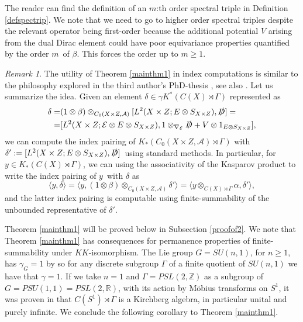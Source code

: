 \documentclass[a4paper,reqno]{amsart}
\numberwithin{equation}{section}
\def\R{\mathbb{R}}
\def\Z{\mathbb{Z}}
\theoremstyle{definition}
\theoremstyle{remark}
\newtheorem{remark*}[thm*]{Remark}
\begin{document}
The reader can find the definition of an $m$:th order spectral triple in Definition \ref{defspectrip}. We note that we need to go to higher order spectral triples despite the relevant operator being first-order because the additional potential $V$ arising from the dual Dirac element could have poor equivariance properties quantified by the order $m$ of $\beta$. This forces the order up to $m\geq 1$. 


\begin{remark*}
The utility of Theorem \ref{mainthm1} in index computations is similar to the philosophy explored in the third author's PhD-thesis \cite{levithesis}, see also \cite{levipaper}. Let us summarize the idea. Given an element $\delta\in \gamma K^*(C(X)\rtimes \Gamma)$ represented as 
\begin{align}
\label{kasprodforsda}
\delta=&(1\otimes \beta)\otimes_{C_0(X\times Z,\mathcal{A})} [L^2(X\times Z;E\otimes S_{X\times Z}),\slashed{D}]=\\
\nonumber
=&[L^2(X\times Z;\mathcal{E}\otimes E\otimes S_{X\times Z} ),1\otimes_{\nabla_\mathcal{E}}\slashed{D}+V\otimes 1_{E\otimes S_{X\times Z}}],
\end{align}
we can compute the index pairing of $K_*(C_0(X\times Z,\mathcal{A})\rtimes \Gamma)$ with $\delta':=[L^2(X\times Z;E\otimes S_{X\times Z}),\slashed{D}]$ using standard methods. In particular, for $y\in K_*(C(X)\rtimes \Gamma)$, we can using the associativity of the Kasparov product to write the index pairing of $y$ with $\delta$ as 
$$\langle y,\delta\rangle=\langle y,(1\otimes \beta)\otimes_{C_0(X\times Z,\mathcal{A})}\delta'\rangle=\langle y\otimes_{C(X)\rtimes \Gamma}\alpha ,\delta'\rangle,$$
and the latter index pairing is computable using finite-summability of the unbounded representative of $\delta'$.


\end{remark*}




Theorem \ref{mainthm1} will be proved below in Subsection \ref{proofof2}. We note that Theorem \ref{mainthm1} has consequences for permanence properties of finite-summability under $KK$-isomorphism. The Lie group $G=SU(n,1)$, for $n\geq 1$, has $\gamma_G=1$ by \cite{julgkasparov} so for any discrete subgroup $\Gamma$ of a finite quotient of $SU(n,1)$ we have that $\gamma=1$. If we take $n=1$ and $\Gamma=PSL(2,\Z)$ as a subgroup of $G=PSU(1,1)=PSL(2,\R)$, with its action by Möbius transforms on $S^1$, it was proven in \cite{ananth} that $C(S^1)\rtimes \Gamma$ is a Kirchberg algebra, in particular unital and purely infinite. We conclude the following corollary to Theorem \ref{mainthm1}.
\end{document}
